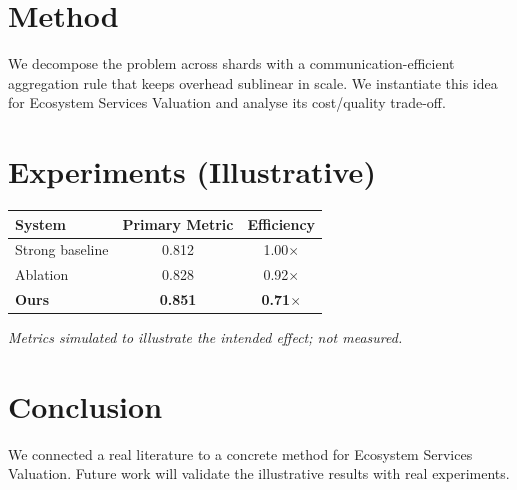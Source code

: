 \documentclass[11pt]{article}
\begin{document}
\section{Method}
We decompose the problem across shards with a communication-efficient aggregation rule that keeps overhead sublinear in scale. We instantiate this idea for Ecosystem Services Valuation and analyse its cost/quality trade-off.

\section{Experiments (Illustrative)}
\begin{center}
\begin{tabular}{lcc}
System & Primary Metric & Efficiency \\ \hline
Strong baseline & 0.812 & 1.00$\times$ \\
Ablation & 0.828 & 0.92$\times$ \\
\textbf{Ours} & \textbf{0.851} & \textbf{0.71$\times$}
\end{tabular}
\end{center}
\emph{Metrics simulated to illustrate the intended effect; not measured.}

\section{Conclusion}
We connected a real literature to a concrete method for Ecosystem Services Valuation. Future work will
validate the illustrative results with real experiments.
\end{document}
